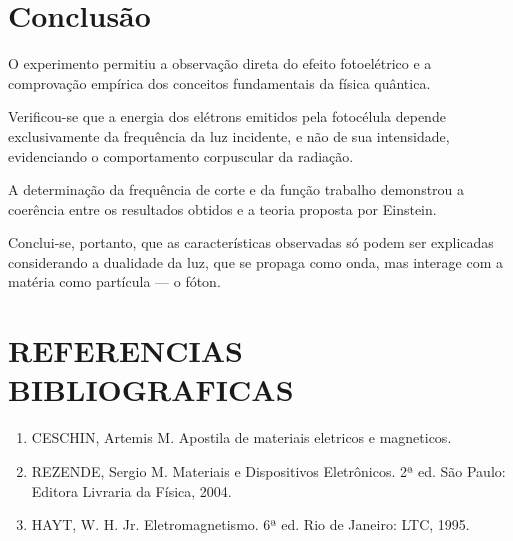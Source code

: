 \documentclass[10pt,twocolumn,letterpaper]{article}
\begin{document}

\section{Conclusão}

\hspace{1cm} O experimento permitiu a observação direta do efeito fotoelétrico e a comprovação empírica dos conceitos fundamentais da física quântica.

\hspace{1cm} Verificou-se que a energia dos elétrons emitidos pela fotocélula depende exclusivamente da frequência da luz incidente, e não de sua intensidade, evidenciando o comportamento corpuscular da radiação.

\hspace{1cm} A determinação da frequência de corte e da função trabalho demonstrou a coerência entre os resultados obtidos e a teoria proposta por Einstein.

\hspace{1cm} Conclui-se, portanto, que as características observadas só podem ser explicadas considerando a dualidade da luz, que se propaga como onda, mas interage com a matéria como partícula — o fóton.

\section{REFERENCIAS BIBLIOGRAFICAS}

{\small
\begin{enumerate}

    \item CESCHIN, Artemis M. Apostila de materiais eletricos e magneticos.

    \item REZENDE, Sergio M. Materiais e Dispositivos Eletrônicos. 2ª ed. São Paulo: Editora Livraria da Física, 2004.

    \item HAYT, W. H. Jr. Eletromagnetismo. 6ª ed. Rio de Janeiro: LTC, 1995.
    
\end{enumerate}
}
\end{document}
